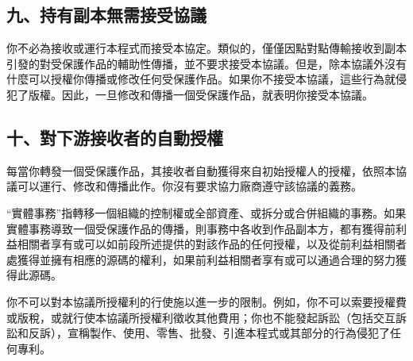 \subsection{九、持有副本無需接受協議}
你不必為接收或運行本程式而接受本協定。類似的，僅僅因點對點傳輸接收到副本引發的對受保護作品的輔助性傳播，並不要求接受本協議。但是，除本協議外沒有什麼可以授權你傳播或修改任何受保護作品。如果你不接受本協議，這些行為就侵犯了版權。因此，一旦修改和傳播一個受保護作品，就表明你接受本協議。
\subsection{十、對下游接收者的自動授權}
每當你轉發一個受保護作品，其接收者自動獲得來自初始授權人的授權，依照本協議可以運行、修改和傳播此作。你沒有要求協力廠商遵守該協議的義務。\par
“實體事務”指轉移一個組織的控制權或全部資產、或拆分或合併組織的事務。如果實體事務導致一個受保護作品的傳播，則事務中各收到作品副本方，都有獲得前利益相關者享有或可以如前段所述提供的對該作品的任何授權，以及從前利益相關者處獲得並擁有相應的源碼的權利，如果前利益相關者享有或可以通過合理的努力獲得此源碼。\par
你不可以對本協議所授權利的行使施以進一步的限制。例如，你不可以索要授權費或版稅，或就行使本協議所授權利徵收其他費用；你也不能發起訴訟（包括交互訴訟和反訴），宣稱製作、使用、零售、批發、引進本程式或其部分的行為侵犯了任何專利。
